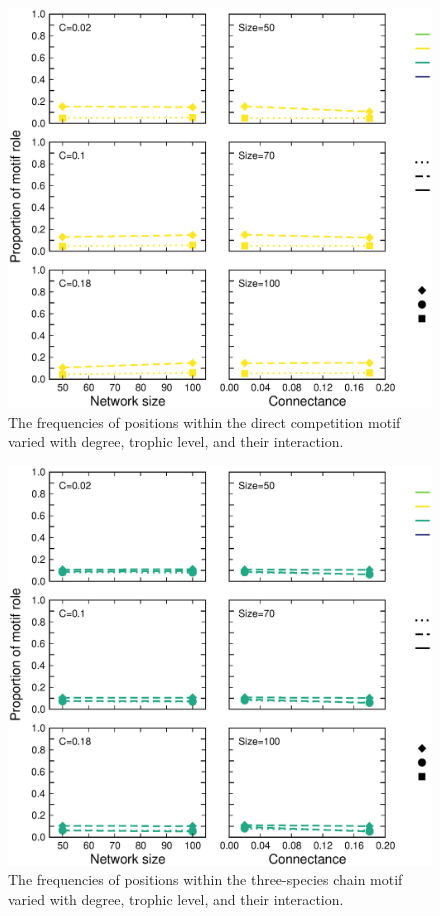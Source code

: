 \documentclass[12pt]{article}
\begin{document}
\begin{spacing}{2.0}
            \begin{figure}[h!]
                \centering
                \includegraphics[width=.75\textwidth]{figures/positions_bySC_Directcompetition.eps}
                \caption{The frequencies of positions within the direct competition motif varied with degree, trophic level, and their interaction.}
                \label{dircomp_SC}
            \end{figure}
    
    
            \begin{figure}[h!]
                \centering
                \includegraphics[width=.75\textwidth]{figures/positions_bySC_Three-specieschain.eps}
                \caption{The frequencies of positions within the three-species chain motif varied with degree, trophic level, and their interaction.}
                \label{chain_SC}
            \end{figure}
    

\end{spacing}
\end{document}
